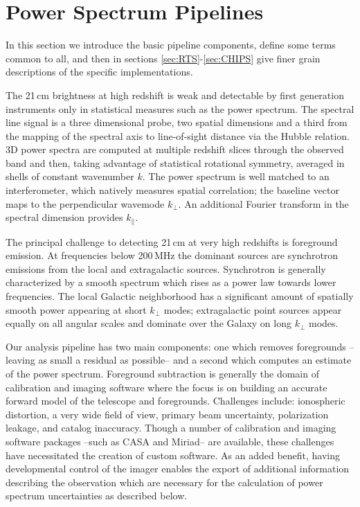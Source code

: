 \documentclass[twolcolumn,iop]{emulateapj}
\begin{document}
\section{Power Spectrum Pipelines}
\label{sec:pipelines}
In this section we introduce the basic pipeline components, define some terms common to all, and then in sections \ref{sec:RTS}-\ref{sec:CHIPS} give finer grain descriptions of the specific implementations.

The 21\,cm brightness at high redshift is weak and detectable by first generation instruments only in	 statistical measures such as the power spectrum. The spectral line signal is a three dimensional probe, two spatial dimensions and a third from the mapping of the spectral axis to line-of-sight distance via the Hubble relation. 3D power spectra are computed at multiple redshift slices through the observed band and then, taking advantage of statistical rotational symmetry, averaged in shells of constant wavenumber $k$.  The power spectrum is well matched to an interferometer, which natively measures spatial correlation; the baseline vector maps to the perpendicular wavemode $k_\perp$.  An additional Fourier transform in the spectral dimension provides $k_\parallel$.  

The principal challenge to detecting 21\,cm at very high redshifts is foreground emission. At frequencies below 200\,MHz the dominant sources are synchrotron emissions from the local and extragalactic sources. Synchrotron is generally characterized by a smooth spectrum which rises as a power law towards lower frequencies. The local Galactic neighborhood has a significant amount of spatially smooth power appearing at short $k_\perp$ modes; extragalactic point sources appear equally on all angular scales and dominate over the Galaxy on long $k_\perp$ modes. 



Our analysis pipeline has two main components: one which removes foregrounds --leaving as small a residual as possible-- and a second which computes an estimate of the power spectrum.   Foreground subtraction is generally the domain of calibration and imaging software where the focus is on building an accurate forward model of the telescope and foregrounds.  Challenges include: ionospheric distortion, a very wide field of view, primary beam uncertainty, polarization leakage, and catalog inaccuracy. Though a number of calibration and imaging software packages --such as CASA and Miriad-- are available, these challenges have necessitated the creation of custom software.  As an added benefit, having developmental control of the imager enables the export of additional information describing the observation which are necessary for the calculation of power spectrum uncertainties as described below. 
\end{document}

